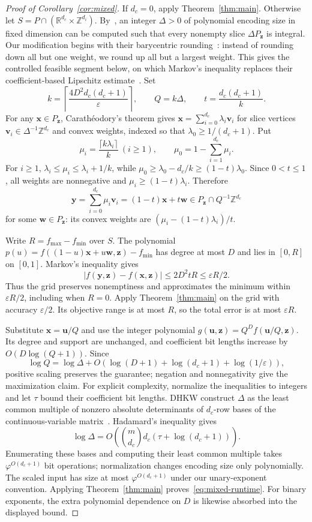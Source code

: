 \documentclass[final,5p,times,twocolumn]{elsarticle}
\theoremstyle{definition}\newtheorem{definition}{Definition}[section]
\theoremstyle{remark}\newtheorem{remark}[theorem]{Remark}
\newcommand{\R}{\mathbb R}\newcommand{\Q}{\mathbb Q}\newcommand{\Z}{\mathbb Z}
\newcommand{\eps}{\varepsilon}
\begin{document}
\begin{proof}[Proof of Corollary~\ref{cor:mixed}]
If $d_c=0$, apply Theorem~\ref{thm:main}. Otherwise let $S=P\cap(\R^{d_c}\times\Z^{d_i})$. By~\cite[Lemma~9]{DHKW08}, an integer $\Delta>0$ of polynomial encoding size in fixed dimension can be computed such that every nonempty slice $\Delta P_{\mathbf z}$ is integral. Our modification begins with their barycentric rounding~\cite[Lemma~10]{DHKW08}: instead of rounding down all but one weight, we round up all but a largest weight. This gives the controlled feasible segment below, on which Markov's inequality replaces their coefficient-based Lipschitz estimate~\cite[Lemma~11]{DHKW08}. Set
\[
 k=\left\lceil\frac{4D^2d_c(d_c+1)}{\eps}\right\rceil,
 \qquad Q=k\Delta,\qquad t=\frac{d_c(d_c+1)}k.
\]
For any $\mathbf x\in P_{\mathbf z}$, Carath\'eodory's theorem gives $\mathbf x=\sum_{i=0}^{d_c}\lambda_i\mathbf v_i$ for slice vertices $\mathbf v_i\in\Delta^{-1}\Z^{d_c}$ and convex weights, indexed so that $\lambda_0\ge1/(d_c+1)$. Put
\[
 \mu_i=\frac{\lceil k\lambda_i\rceil}{k}\ (i\ge1),
 \qquad \mu_0=1-\sum_{i=1}^{d_c}\mu_i.
\]
For $i\ge1$, $\lambda_i\le\mu_i\le\lambda_i+1/k$, while
$\mu_0\ge\lambda_0-d_c/k\ge(1-t)\lambda_0$. Since $0<t\le1$, all weights are nonnegative and $\mu_i\ge(1-t)\lambda_i$. Therefore
\[
 \mathbf y=\sum_{i=0}^{d_c}\mu_i\mathbf v_i
 =(1-t)\mathbf x+t\mathbf w\in P_{\mathbf z}\cap Q^{-1}\Z^{d_c}
\]
for some $\mathbf w\in P_{\mathbf z}$: its convex weights are $(\mu_i-(1-t)\lambda_i)/t$.

Write $R=f_{\max}-f_{\min}$ over $S$. The polynomial
$p(u)=f((1-u)\mathbf x+u\mathbf w,\mathbf z)-f_{\min}$ has degree at most $D$ and lies in $[0,R]$ on $[0,1]$. Markov's inequality gives
\[
 |f(\mathbf y,\mathbf z)-f(\mathbf x,\mathbf z)|
 \le2D^2tR\le\eps R/2.
\]
Thus the grid preserves nonemptiness and approximates the minimum within $\eps R/2$, including when $R=0$. Apply Theorem~\ref{thm:main} on the grid with accuracy $\eps/2$. Its objective range is at most $R$, so the total error is at most $\eps R$.

Substitute $\mathbf x=\mathbf u/Q$ and use the integer polynomial $g(\mathbf u,\mathbf z)=Q^D f(\mathbf u/Q,\mathbf z)$. Its degree and support are unchanged, and coefficient bit lengths increase by $O(D\log(Q+1))$. Since
\[
 \log Q=\log\Delta+
 O\!\left(\log(D+1)+\log(d_c+1)+\log(1/\eps)\right),
\]
positive scaling preserves the guarantee; negation and nonnegativity give the maximization claim. For explicit complexity, normalize the inequalities to integers and let $\tau$ bound their coefficient bit lengths. DHKW construct $\Delta$ as the least common multiple of nonzero absolute determinants of $d_c$-row bases of the continuous-variable matrix~\cite[proof of Lemma~9]{DHKW08}. Hadamard's inequality gives
\[
 \log\Delta=O\!\left(\binom{m}{d_c} d_c(\tau+\log(d_c+1))\right).
\]
Enumerating these bases and computing their least common multiple takes $\varphi^{O(d_c+1)}$ bit operations; normalization changes encoding size only polynomially. The scaled input has size at most $\varphi^{O(d_c+1)}$ under our unary-exponent convention. Applying Theorem~\ref{thm:main} proves~\eqref{eq:mixed-runtime}. For binary exponents, the extra polynomial dependence on $D$ is likewise absorbed into the displayed bound.


\end{proof}
\end{document}
